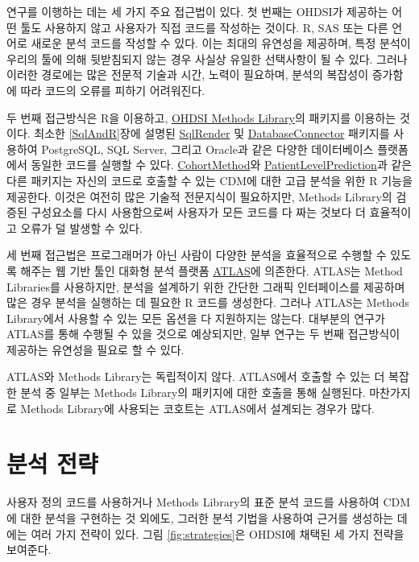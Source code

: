 \documentclass[10.5pt]{book}
\theoremstyle{definition}
\theoremstyle{definition}
\theoremstyle{definition}
\theoremstyle{remark}
\begin{document}
연구를 이행하는 데는 세 가지 주요 접근법이 있다. 첫 번째는 OHDSI가
제공하는 어떤 툴도 사용하지 않고 사용자가 직접 코드를 작성하는 것이다.
R, SAS 또는 다른 언어로 새로운 분석 코드를 작성할 수 있다. 이는 최대의
유연성을 제공하며, 특정 분석이 우리의 툴에 의해 뒷받침되지 않는 경우
사실상 유일한 선택사항이 될 수 있다. 그러나 이러한 경로에는 많은 전문적
기술과 시간, 노력이 필요하며, 분석의 복잡성이 증가함에 따라 코드의
오류를 피하기 어려워진다.

두 번째 접근방식은 R을 이용하고,
\href{https://ohdsi.github.io/MethodsLibrary/}{OHDSI Methods Library}의
패키지를 이용하는 것이다. 최소한 \ref{SqlAndR}장에 설명된
\href{https://ohdsi.github.io/SqlRender/}{SqlRender} 및
\href{https://ohdsi.github.io/DatabaseConnector/}{DatabaseConnector}
패키지를 사용하여 PostgreSQL, SQL Server, 그리고 Oracle과 같은 다양한
데이터베이스 플랫폼에서 동일한 코드를 실행할 수 있다.
\href{https://ohdsi.github.io/CohortMethod/}{CohortMethod}와
\href{https://ohdsi.github.io/PatientLevelPrediction/}{PatientLevelPrediction}과
같은 다른 패키지는 자신의 코드로 호출할 수 있는 CDM에 대한 고급 분석을
위한 R 기능을 제공한다. 이것은 여전히 많은 기술적 전문지식이 필요하지만,
Methods Library의 검증된 구성요소를 다시 사용함으로써 사용자가 모든
코드를 다 짜는 것보다 더 효율적이고 오류가 덜 발생할 수 있다.

세 번째 접근법은 프로그래머가 아닌 사람이 다양한 분석을 효율적으로
수행할 수 있도록 해주는 웹 기반 툴인 대화형 분석 플랫폼
\href{https://github.com/OHDSI/Atlas/wiki}{ATLAS}에 의존한다. ATLAS는
Method Libraries를 사용하지만, 분석을 설계하기 위한 간단한 그래픽
인터페이스를 제공하며 많은 경우 분석을 실행하는 데 필요한 R 코드를
생성한다. 그러나 ATLAS는 Methods Library에서 사용할 수 있는 모든 옵션을
다 지원하지는 않는다. 대부분의 연구가 ATLAS를 통해 수행될 수 있을 것으로
예상되지만, 일부 연구는 두 번째 접근방식이 제공하는 유연성을 필요로 할
수 있다.

ATLAS와 Methods Library는 독립적이지 않다. ATLAS에서 호출할 수 있는 더
복잡한 분석 중 일부는 Methods Library의 패키지에 대한 호출을 통해
실행된다. 마찬가지로 Methods Library에 사용되는 코호트는 ATLAS에서
설계되는 경우가 많다.

\section{분석 전략}\label{-}

사용자 정의 코드를 사용하거나 Methods Library의 표준 분석 코드를
사용하여 CDM에 대한 분석을 구현하는 것 외에도, 그러한 분석 기법을
사용하여 근거를 생성하는 데에는 여러 가지 전략이 있다. 그림
\ref{fig:strategies}은 OHDSI에 채택된 세 가지 전략을 보여준다.
\end{document}
